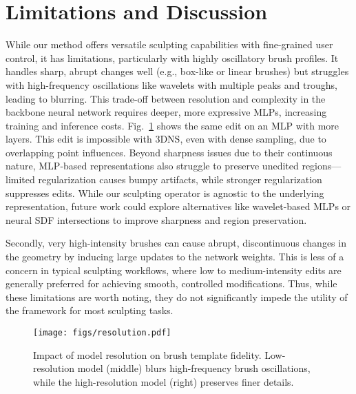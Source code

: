 \section{Limitations and Discussion}


While our method offers versatile sculpting capabilities with fine-grained user control, it has limitations, particularly with highly oscillatory brush profiles. It handles sharp, abrupt changes well (e.g., box-like or linear brushes) but struggles with high-frequency oscillations like wavelets with multiple peaks and troughs, leading to blurring. This trade-off between resolution and complexity in the backbone neural network requires deeper, more expressive MLPs, increasing training and inference costs. Fig.~\ref{fig:brush} shows the same edit on an MLP with more layers. This edit is impossible with 3DNS, even with dense sampling, due to overlapping point influences. Beyond sharpness issues due to their continuous nature, MLP-based representations also struggle to preserve unedited regions—limited regularization causes bumpy artifacts, while stronger regularization suppresses edits. While our sculpting operator is agnostic to the underlying representation, future work could explore alternatives like wavelet-based MLPs or neural SDF intersections to improve sharpness and region preservation.

Secondly, very high-intensity brushes can cause abrupt, discontinuous changes in the geometry by inducing large updates to the network weights. This is less of a concern in typical sculpting workflows, where low to medium-intensity edits are generally preferred for achieving smooth, controlled modifications. Thus, while these limitations are worth noting, they do not significantly impede the utility of the framework for most sculpting tasks.

\begin{figure}[t]
  \centering
   \texttt{[image: figs/resolution.pdf]}

   \caption{Impact of model resolution on brush template fidelity. Low-resolution model (middle) blurs high-frequency brush oscillations, while the high-resolution model (right) preserves finer details.}
   \label{fig:brush}
   \vspace{-0.5cm}
\end{figure}